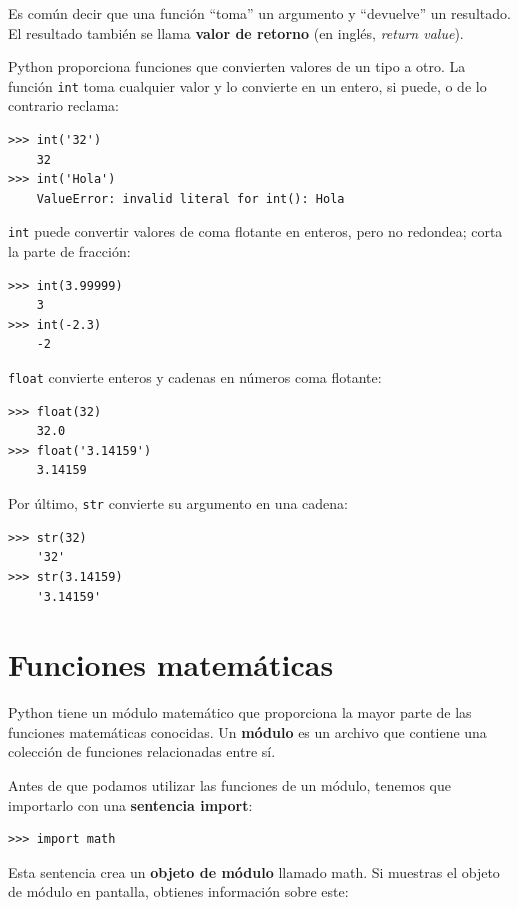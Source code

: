 \documentclass[10pt]{book}
\begin{document}
Es común decir que una función ``toma'' un argumento y ``devuelve''
un resultado.  El resultado también se llama {\bf valor de retorno} (en inglés, {\em return value}).

Python proporciona funciones que convierten valores
de un tipo a otro.  La función {\tt int} toma cualquier valor y
lo convierte en un entero, si puede, o de lo contrario reclama:

\begin{verbatim}
>>> int('32')
    32
>>> int('Hola')
    ValueError: invalid literal for int(): Hola
\end{verbatim}
%
{\tt int} puede convertir valores de coma flotante en enteros, pero
no redondea; corta la parte de fracción:

\begin{verbatim}
>>> int(3.99999)
    3
>>> int(-2.3)
    -2
\end{verbatim}
%
{\tt float} convierte enteros y cadenas en números coma
flotante:

\begin{verbatim}
>>> float(32)
    32.0
>>> float('3.14159')
    3.14159
\end{verbatim}
%
Por último, {\tt str} convierte su argumento en una cadena:

\begin{verbatim}
>>> str(32)
    '32'
>>> str(3.14159)
    '3.14159'
\end{verbatim}
%

\section{Funciones matemáticas}

Python tiene un módulo matemático que proporciona la mayor parte de las
funciones matemáticas conocidas.  Un {\bf módulo} es un archivo que contiene una
colección de funciones relacionadas entre sí.

Antes de que podamos utilizar las funciones de un módulo, tenemos que importarlo con
una {\bf sentencia import}:

\begin{verbatim}
>>> import math
\end{verbatim}
%
Esta sentencia crea un {\bf objeto de módulo} llamado math.  Si
muestras el objeto de módulo en pantalla, obtienes información sobre este:
\end{document}
